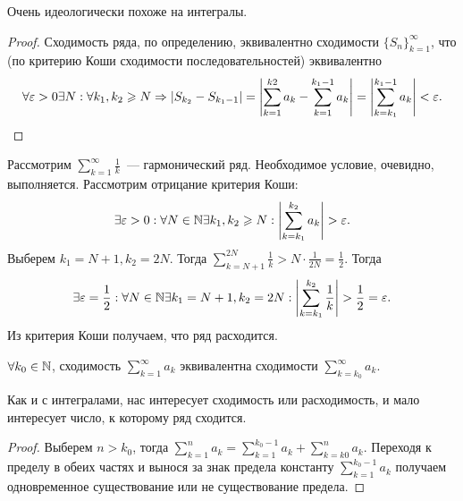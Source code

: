 \documentclass[../main.tex]{subfiles}
\begin{document}
\begin{note}
  Очень идеологически похоже на интегралы.
\end{note}


\begin{proof}
  Сходимость ряда, по определению, эквивалентно сходимости $ \{S_n\}_{k=1}^{ \infty }$, что (по критерию Коши сходимости последовательностей) эквивалентно 
  \begin{gather} 
    \forall \varepsilon > 0 \exists N: \forall k_1, k_2 \geqslant N \Rightarrow \left| S_{k_2 } - S_{k_{1} - 1} \right| = \left| \sum_{k=1}^{k2} a_k - \sum_{k=1}^{k_1 - 1} a_k  \right| = \left| \sum_{k=k_1 }^{k_1 -1} a_k  \right| < \varepsilon .
  \end{gather}
\end{proof}

\begin{example}
  Рассмотрим $ \sum_{k=1}^{\infty} \frac{1}{k} $~--- гармонический ряд. Необходимое условие, очевидно, выполняется. Рассмотрим отрицание критерия Коши: 
  \begin{gather} 
    \exists \varepsilon > 0 : \forall N \in \mathbb{N} \exists k_1,k_2 \geqslant N: \left| \sum_{k=k_1 }^{k_2 } a_k  \right| > \varepsilon .
  \end{gather}
  Выберем $k_1 = N + 1, k_2 = 2N$. Тогда $ \sum_{k=N+1}^{2N} \frac{1}{k} > N \cdot \frac{1}{2N} = \frac{1}{2} $. Тогда 
  \begin{gather} 
    \exists \varepsilon = \frac{1}{2} : \forall N \in \mathbb{N} \exists k_1 = N + 1, k_2 = 2N : \left| \sum_{k=k_1}^{k_2 } \frac{1}{k}  \right| > \frac{1}{2} = \varepsilon  .
  \end{gather}
  Из критерия Коши получаем, что ряд расходится.
\end{example}


\begin{proposition} \label{prop:ser:local}
  $\forall k_0 \in \mathbb{N}$, сходимость $ \sum_{k=1}^{\infty} a_k $ эквивалентна сходимости $ \sum_{k=k_0 }^{\infty} a_k $. 
\end{proposition}


\begin{note}
  Как и с интегралами, нас интересует сходимость или расходимость, и мало интересует число, к которому ряд сходится.
\end{note}


\begin{proof}
  Выберем $n > k_0 $, тогда $ \sum_{k=1}^{n} a_k  = \sum_{k=1}^{k_0 - 1} a_k + \sum_{k=k0}^{n} a_k  $. Переходя к пределу в обеих частях и вынося за знак предела константу $ \sum_{k=1}^{k_0 -1} a_k $ получаем одновременное существование или не существование предела. 
\end{proof}
\end{document}
